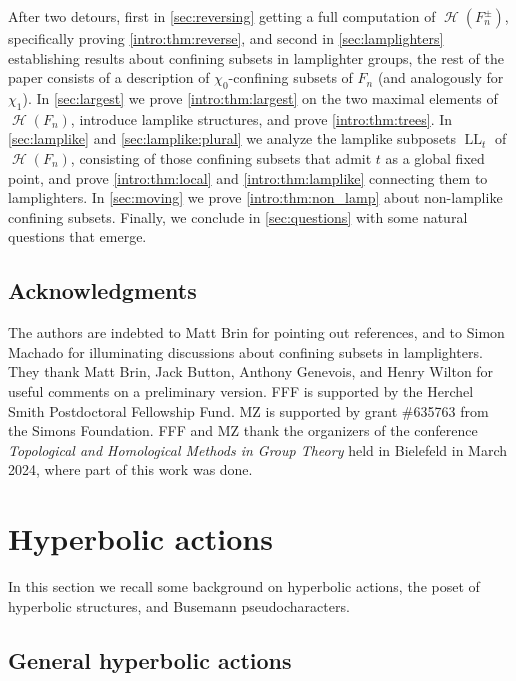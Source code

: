 \documentclass[reqno,12pt]{amsart}\setcounter{tocdepth}{1}
\theoremstyle{definition}
\DeclareMathOperator{\Hyp}{\mathcal{H}}
\DeclareMathOperator{\LL}{LL}
\numberwithin{equation}{section}
\begin{document}
After two detours, first in \cref{sec:reversing} getting a full computation of $\Hyp(F_n^\pm)$, specifically proving \cref{intro:thm:reverse}, and second in \cref{sec:lamplighters} establishing results about confining subsets in lamplighter groups, the rest of the paper consists of a description of $\chi_0$-confining subsets of $F_n$ (and analogously for $\chi_1$). In \cref{sec:largest} we prove \cref{intro:thm:largest} on the two maximal elements of $\Hyp(F_n)$, introduce lamplike structures, and prove \cref{intro:thm:trees}. In \cref{sec:lamplike} and \cref{sec:lamplike:plural} we analyze the lamplike subposets $\LL_t$ of $\Hyp(F_n)$, consisting of those confining subsets that admit $t$ as a global fixed point, and prove \cref{intro:thm:local} and \cref{intro:thm:lamplike} connecting them to lamplighters. In \cref{sec:moving} we prove \cref{intro:thm:non_lamp} about non-lamplike confining subsets. Finally, we conclude in \cref{sec:questions} with some natural questions that emerge.

\subsection*{Acknowledgments} The authors are indebted to Matt Brin for pointing out references, and to Simon Machado for illuminating discussions about confining subsets in lamplighters. They thank Matt Brin, Jack Button, Anthony Genevois, and Henry Wilton for useful comments on a preliminary version. FFF is supported by the Herchel Smith Postdoctoral Fellowship Fund. MZ is supported by grant \#635763 from the Simons Foundation. FFF and MZ thank the organizers of the conference \emph{Topological and Homological Methods in Group Theory} held in Bielefeld in March 2024, where part of this work was done.



\section{Hyperbolic actions}\label{sec:actions}

In this section we recall some background on hyperbolic actions, the poset of hyperbolic structures, and Busemann pseudocharacters.


\subsection{General hyperbolic actions}\label{ssec:general_hyp_actions}
\end{document}
